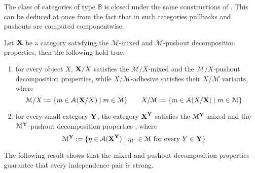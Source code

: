 \documentclass[a4paper,UKenglish,cleveref,pdftex,thm-restate,numberwithinsect,anonymous]{lipics}
\def\X{\textbf {\textup{X}}}
\def\Y{\textbf {\textup{Y}}}
\begin{document}
The class of categories of type $\mathbb{B}$ is closed under the same constructions of . This can be deduced at once from the fact that in such categories pullbacks and pushouts are computed componentwise.

\begin{lemma}\label{lem:closed} Let $\X$ be a category satisfying the $\mathcal{M}$-mixed and $\mathcal{M}$-pushout decomposition properties, then the following hold true:
	\begin{enumerate}
		\item  for every object $X$, $\X/X$ satisfies  the $\mathcal{M}/X$-mixed and the $\mathcal{M}/X$-pushout decomposition properties, while $X/\mathcal{M}$-adhesive satisfies their $X/\mathcal{M}$ variants, where
		\[\mathcal{M}/X:=\{m\in \mathcal{A}(\X/X) \mid m\in \mathcal{M} \}
		\qquad X/\mathcal{M}:=\{m\in \mathcal{A}(X/\X) \mid m\in
		\mathcal{M} \}
		\]
		\item  for every small
		category $\Y$, the category $\X^\Y$ satisfies the 
		$\mathcal{M}^{\Y}$-mixed and the $\mathcal{M}^{\Y}$-pushout decomposition properties , where
		\[\mathcal{M}^{\Y}:=\{\eta \in \mathcal{A}(\X^\Y) \mid \eta_Y \in
		\mathcal{M} \text{ for every } Y\in \Y\}\]
	\end{enumerate}
\end{lemma}

The following result shows that the mixed and pushout decomposition properties guarantee that every independence pair is strong.
\end{document}

